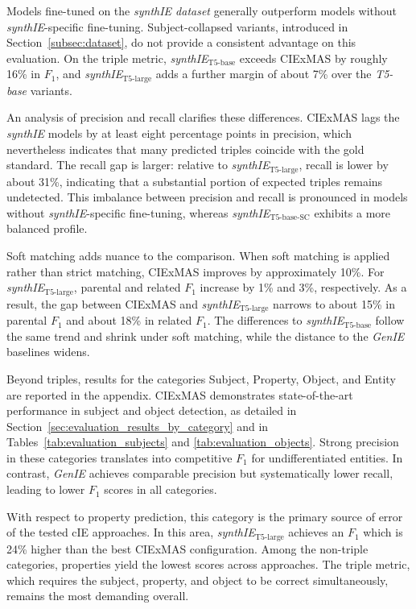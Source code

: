 \documentclass[a4paper,oneside,bibliography=totoc]{scrbook}
\begin{document}
Models fine-tuned on the \textit{synthIE dataset} generally outperform models without \textit{synthIE}-specific fine-tuning. Subject-collapsed variants, introduced in Section~\ref{subsec:dataset}, do not provide a consistent advantage on this evaluation. On the triple metric, \textit{synthIE}$_{\text{T5-base}}$ exceeds CIExMAS by roughly 16\% in $F_1$, and \textit{synthIE}$_{\text{T5-large}}$ adds a further margin of about 7\% over the \textit{T5-base} variants.

An analysis of precision and recall clarifies these differences. CIExMAS lags the \textit{synthIE} models by at least eight percentage points in precision, which nevertheless indicates that many predicted triples coincide with the gold standard. The recall gap is larger: relative to \textit{synthIE}$_{\text{T5-large}}$, recall is lower by about 31\%, indicating that a substantial portion of expected triples remains undetected. This imbalance between precision and recall is pronounced in models without \textit{synthIE}-specific fine-tuning, whereas \textit{synthIE}$_{\text{T5-base-SC}}$ exhibits a more balanced profile.

Soft matching adds nuance to the comparison. When soft matching is applied rather than strict matching, CIExMAS improves by approximately 10\%. For \textit{synthIE}$_{\text{T5-large}}$, parental and related $F_1$ increase by 1\% and 3\%, respectively. As a result, the gap between CIExMAS and \textit{synthIE}$_{\text{T5-large}}$ narrows to about 15\% in parental $F_1$ and about 18\% in related $F_1$. The differences to \textit{synthIE}$_{\text{T5-base}}$ follow the same trend and shrink under soft matching, while the distance to the \textit{GenIE} baselines widens.

Beyond triples, results for the categories Subject, Property, Object, and Entity are reported in the appendix. CIExMAS demonstrates state-of-the-art performance in subject and object detection, as detailed in Section~\ref{sec:evaluation_results_by_category} and in Tables~\ref{tab:evaluation_subjects} and \ref{tab:evaluation_objects}. Strong precision in these categories translates into competitive $F_1$ for undifferentiated entities. In contrast, \textit{GenIE} achieves comparable precision but systematically lower recall, leading to lower $F_1$ scores in all categories.

With respect to property prediction, this category is the primary source of error of the tested \ac{cIE} approaches. In this area, \textit{synthIE}$_{\text{T5-large}}$ achieves an $F_1$ which is 24\% higher than the best CIExMAS configuration. Among the non-triple categories, properties yield the lowest scores across approaches. The triple metric, which requires the subject, property, and object to be correct simultaneously, remains the most demanding overall.
\end{document}
